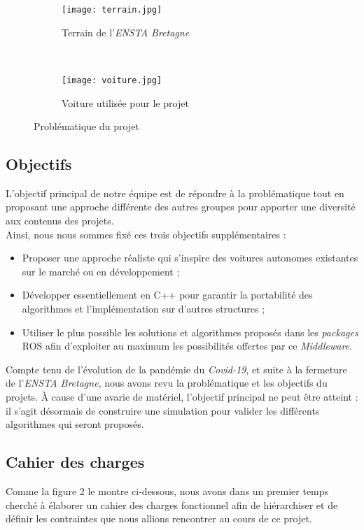 \documentclass[12pt, openany]{report}
\begin{document}
\begin{figure}[!h]
     \centering
     \begin{subfigure}[b]{0.45\textwidth}
         \centering
         \texttt{[image: terrain.jpg]}
         \caption{Terrain de l'\textit{ENSTA Bretagne}}
     \end{subfigure}
     ~
     \begin{subfigure}[b]{0.45\textwidth}
         \centering
         \texttt{[image: voiture.jpg]}
         \caption{Voiture utilisée pour le projet}
     \end{subfigure}
     \caption{Problématique du projet}
     \label{fig:prob}
\end{figure}

\subsection{Objectifs}
L'objectif principal de notre équipe est de répondre à la problématique tout en proposant une approche différente des autres groupes pour apporter une diversité aux contenus des projets.\\

Ainsi, nous nous sommes fixé ces trois objectifs supplémentaires : 
\begin{itemize}[label=\textbullet, font=\small]
    \item Proposer une approche réaliste qui s'inspire des voitures autonomes existantes sur le marché ou en développement ;
    \item Développer essentiellement en \textsc{C++} pour garantir la portabilité des algorithmes et l'implémentation sur d'autres structures ;\\
    \item Utiliser le plus possible les solutions et algorithmes proposés dans les \textit{packages} \textsc{ROS} afin d'exploiter au maximum les possibilités offertes par ce \textit{Middleware}.\\
\end{itemize}

Compte tenu de l'évolution de la pandémie du \textit{Covid-19}, et suite à la fermeture de l'\textit{ENSTA Bretagne}, nous avons revu la problématique et les objectifs du projets. À cause d'une avarie de matériel, l'objectif principal ne peut être atteint : il s'agit désormais de construire une simulation pour valider les différents algorithmes qui seront proposés.

\subsection{Cahier des charges}
Comme la figure 2 le montre ci-dessous, nous avons dans un premier temps cherché à élaborer un cahier des charges fonctionnel afin de hiérarchiser et de définir les contraintes que nous allions rencontrer au cours de ce projet.\\
\end{document}

